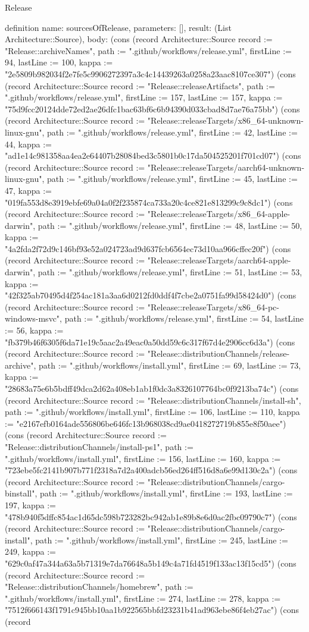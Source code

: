 \begin{lexlean}{Release}
\begin{semanticmodule}
definition{
  name: sourcesOfRelease,
  parameters: [],
  result: (List Architecture::Source),
  body: (cons (record Architecture::Source {record := "Release::archiveNames", path := ".github/workflows/release.yml", firstLine := 94, lastLine := 100, kappa := "2e5809b982034f2e7fe5c9906272397a3c4c14439263a0258a23aac8107ce307"}) (cons (record Architecture::Source {record := "Release::releaseArtifacts", path := ".github/workflows/release.yml", firstLine := 157, lastLine := 157, kappa := "75d9fcc20124dde72ed2ae26dfc1bac63bf6c6b94390d033cbad8d7ae76a75bb"}) (cons (record Architecture::Source {record := "Release::releaseTargets/x86_64-unknown-linux-gnu", path := ".github/workflows/release.yml", firstLine := 42, lastLine := 44, kappa := "ad1e14c981358aa4ea2e64407b28084bed3c5801b0c17da504525201f701cd07"}) (cons (record Architecture::Source {record := "Release::releaseTargets/aarch64-unknown-linux-gnu", path := ".github/workflows/release.yml", firstLine := 45, lastLine := 47, kappa := "019fa553d8e3919ebfe69a04a0f2f235874ca733a20c4ce821e813299c9c8dc1"}) (cons (record Architecture::Source {record := "Release::releaseTargets/x86_64-apple-darwin", path := ".github/workflows/release.yml", firstLine := 48, lastLine := 50, kappa := "4a2fda2f72d9c146bf93e52a024723ad9d637fcb6564ec73d10aa966cffec20f"}) (cons (record Architecture::Source {record := "Release::releaseTargets/aarch64-apple-darwin", path := ".github/workflows/release.yml", firstLine := 51, lastLine := 53, kappa := "42f325ab70495d4f254ac181a3aa6d0212fd0ddf4f7cbe2a0751fa99d58424d0"}) (cons (record Architecture::Source {record := "Release::releaseTargets/x86_64-pc-windows-msvc", path := ".github/workflows/release.yml", firstLine := 54, lastLine := 56, kappa := "fb379b46f6305f6da71e19c5aac2a49eac0a50dd59c6c317f67d4e2906cc6d3a"}) (cons (record Architecture::Source {record := "Release::distributionChannels/release-archive", path := ".github/workflows/install.yml", firstLine := 69, lastLine := 73, kappa := "28683a75e6b5bdff49dca2d62a408eb1ab1f0dc3a8326107764bc0f9213ba74c"}) (cons (record Architecture::Source {record := "Release::distributionChannels/install-sh", path := ".github/workflows/install.yml", firstLine := 106, lastLine := 110, kappa := "e2167efb0164ade556806be646fc13b968038cd9ae0418272719b855e8f50aee"}) (cons (record Architecture::Source {record := "Release::distributionChannels/install-ps1", path := ".github/workflows/install.yml", firstLine := 156, lastLine := 160, kappa := "723ebe5fc2141b907b771f2318a7d2a400adcb56ed264ff516d8a6e99d130c2a"}) (cons (record Architecture::Source {record := "Release::distributionChannels/cargo-binstall", path := ".github/workflows/install.yml", firstLine := 193, lastLine := 197, kappa := "478b940f5dffc854ac1d65dc598b723282bc942ab1e89b8e6d0ac2fbc09790c7"}) (cons (record Architecture::Source {record := "Release::distributionChannels/cargo-install", path := ".github/workflows/install.yml", firstLine := 245, lastLine := 249, kappa := "629c0af47a344a63a5b71319e7da76648a5b149c4a71fd4519f133ac13f15cd5"}) (cons (record Architecture::Source {record := "Release::distributionChannels/homebrew", path := ".github/workflows/install.yml", firstLine := 274, lastLine := 278, kappa := "7512f666143f1791c945bb10aa1b922565bbfd23231b41ad963ebe86f4eb27ac"}) (cons (record }
\end{semanticmodule}
\end{lexlean}
